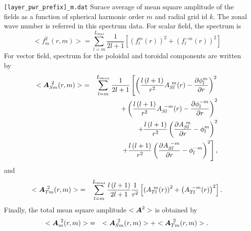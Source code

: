 \begin{description}
\item{\tt [layer\_pwr\_prefix]\_m.dat} Surace average of mean square amplitude of the fields as a function of spherical harmonic order $m$ and radial grid id $k$. The zonal wave number is referred in this spectrum data. For scalar field, the spectrum is
%
\begin{equation}
<f_{m}^{2}(r,m)> = \sum_{l=m}^{L_{max}}  \frac{1}{2l + 1} \left[ \left(f_{l}^{m}(r) \right)^2 
+ \left(f_{l}^{-m}(r) \right)^2 \right]
\end{equation}
%
For vector field, spectrum for the poloidal and toroidal components are written by 
%
\begin{eqnarray}
<\mbox{\boldmath$A$}_{Sm}^{\ 2}(r,m)> &=&   \sum_{l=m}^{L_{max}} \frac{1}{2l + 1}
\left[  \left(\frac{l\left(l+1 \right) }{r^{2}} A_{Sl}^{\ m}(r) - \frac{\partial \phi_{l}^{m}}{\partial r} \right)^{2} 
\right. \nonumber \\
& & + \left(\frac{l\left(l+1 \right) }{r^{2}} A_{Sl}^{\ -m}(r) - \frac{\partial \phi_{l}^{-m}}{\partial r} \right)^{2} 
\nonumber \\
& & +  \frac{l \left( l+1 \right)}{r^{2}} \left( \frac{\partial A_{Sl}^{\ m}}{\partial r} - \phi_{l}^{m} \right)^{2} 
\nonumber \\
& & \left. +  \frac{l \left( l+1 \right)}{r^{2}} \left( \frac{\partial A_{Sl}^{\ -m}}{\partial r} - \phi_{l}^{-m} \right)^{2} \right],
\end{eqnarray}
%
and
\begin{eqnarray}
<\mbox{\boldmath$A$}_{Tm}^{\ 2}(r,m)> &=&  \sum_{l=m}^{L_{max}} \frac{l \left( l+1 \right)}{2l + 1} \frac{1}{r^{2}} 
\left[ \left( A_{Tl}^{\ m}(r) \right)^{2} +  \left( A_{Tl}^{\ -m}(r) \right)^{2} \right].
\end{eqnarray}
Finally, the total mean square amplitude $<\mbox{\boldmath$A$}^{2}> $ is obtained by
\begin{eqnarray}
<\bvec{A}_{m}^{\ 2}(r,m)> &=& <\bvec{A}_{Sm}^{\ 2}(r,m)>  + <\bvec{A}_{Tm}^{\ 2}(r,m)>.
\end{eqnarray}


\end{description}

